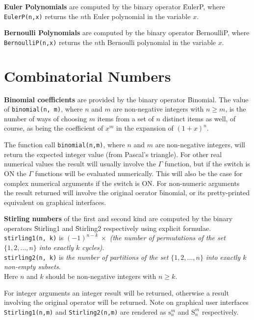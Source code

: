 \textbf{Euler Polynomials} are computed by the binary operator
\f{EulerP}, where\linebreak
\texttt{EulerP(n,x)} returns the $n$th Euler polynomial in the variable $x$.

\textbf{Bernoulli Polynomials} are computed by the binary operator
\f{BernoulliP}, where \texttt{BernoulliP(n,x)} returns the
$n$th Bernoulli polynomial in the variable $x$.

\section{Combinatorial Numbers}
  
\textbf{Binomial coefficients} are provided by the binary operator \f{Binomial}.
The value of \texttt{binomial(n, m)}, where $n$ and $m$ are non-negative
integers with $n \geq m$, is the number of ways of choosing $m$ items from a
set of $n$ distinct items as well, of course, as being the coefficient of $x^m$
in the expansion of $(1+x)^n$.

The function call \texttt{binomial(n,m)}, where $n$ and $m$
are non-negative integers, will return the expected integer value
(from Pascal's triangle). For other real numerical values the result will
usually involve the $\Gamma$ function, but if the switch
 is ON the $\Gamma$ functions will be evaluated numerically.
This will also be the case for complex numerical arguments if the switch
 is ON.  For non-numeric arguments the result returned will
involve the original oerator \f{binomial}, or its pretty-printed equivalent
on graphical interfaces.

\hypertarget{operator:Stirling1}{}\hypertarget{operator:Stirling2}{}
\textbf{Stirling numbers} of the first and second kind are computed
by the binary operators \f{Stirling1} and \f{Stirling2}
respectively using explicit formulae.
\texttt{stirling1(n, k)} is $(-1)^{n-k}\ \times$
\emph{(the number of permutations of the set} $\{1, 2, \ldots, n\}$
\emph{into exactly $k$ cycles)}.\\
\texttt{stirling2(n, k)} is \emph{the number of partitions of the set}
$\{1, 2, \ldots, n\}$ \emph{into exactly $k$ non-empty subsets}.\\
Here $n$ and $k$ should be non-negative integers with $n \geq k$.

For integer arguments an integer result will be
returned, otherwise a result involving the original operator will be returned.
Note on graphical user interfaces \texttt{Stirling1(n,m)} and
\texttt{Stirling2(n,m)} are rendered as
$\mathrm{s}_n^m$ and $\mathrm{S}_n^m$ respectively.

